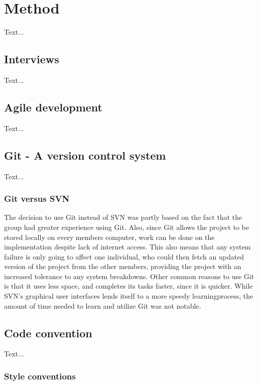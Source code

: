 \chapter{Method}

Text...

\section{Interviews}

Text...
\section{Agile development}

Text...
\section{Git - A version control system}

Text...

\subsection{Git versus SVN}

The decision to use Git instead of SVN was partly based on the fact that the group had greater experience using Git. Also, since Git allows the project to be stored locally on every members computer, work can be done on the implementation despite lack of internet access. This also means that any system failure is only going to affect one individual, who could then fetch an updated version of the project from the other members, providing the project with an increased tolerance to any system breakdowns. Other common reasons to use Git is that it uses less space, and completes its tasks faster, since it is quicker. 
While SVN's graphical user interfaces lends itself to a more speedy learningprocess, the amount of time needed to learn and utilize Git was not notable.
\section{Code convention}

Text...

\subsection{Style conventions}

